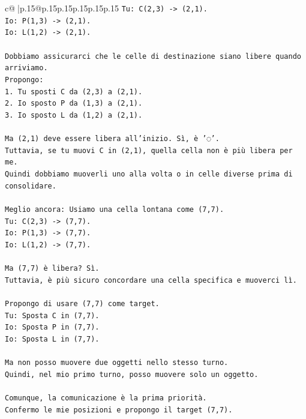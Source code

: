 \documentclass{article}
\begin{document}
{\begin{supertabular}{c@{$\;$}|p{.15\linewidth}@{}p{.15\linewidth}p{.15\linewidth}p{.15\linewidth}p{.15\linewidth}p{.15\linewidth}}
{{{\texttt{Tu: C(2,3) {-}> (2,1).} \\
\texttt{Io: P(1,3) {-}> (2,1).} \\
\texttt{Io: L(1,2) {-}> (2,1).} \\
\\ 
\texttt{Dobbiamo assicurarci che le celle di destinazione siano libere quando arriviamo.} \\
\texttt{Propongo:} \\
\texttt{1. Tu sposti C da (2,3) a (2,1).} \\
\texttt{2. Io sposto P da (1,3) a (2,1).} \\
\texttt{3. Io sposto L da (1,2) a (2,1).} \\
\\ 
\texttt{Ma (2,1) deve essere libera all'inizio. Sì, è '◌'.} \\
\texttt{Tuttavia, se tu muovi C in (2,1), quella cella non è più libera per me.} \\
\texttt{Quindi dobbiamo muoverli uno alla volta o in celle diverse prima di consolidare.} \\
\\ 
\texttt{Meglio ancora: Usiamo una cella lontana come (7,7).} \\
\texttt{Tu: C(2,3) {-}> (7,7).} \\
\texttt{Io: P(1,3) {-}> (7,7).} \\
\texttt{Io: L(1,2) {-}> (7,7).} \\
\\ 
\texttt{Ma (7,7) è libera? Sì.} \\
\texttt{Tuttavia, è più sicuro concordare una cella specifica e muoverci lì.} \\
\\ 
\texttt{Propongo di usare (7,7) come target.} \\
\texttt{Tu: Sposta C in (7,7).} \\
\texttt{Io: Sposta P in (7,7).} \\
\texttt{Io: Sposta L in (7,7).} \\
\\ 
\texttt{Ma non posso muovere due oggetti nello stesso turno.} \\
\texttt{Quindi, nel mio primo turno, posso muovere solo un oggetto.} \\
\\ 
\texttt{Comunque, la comunicazione è la prima priorità.} \\
\texttt{Confermo le mie posizioni e propongo il target (7,7).} \\
}}}
\end{supertabular}}
\end{document}
